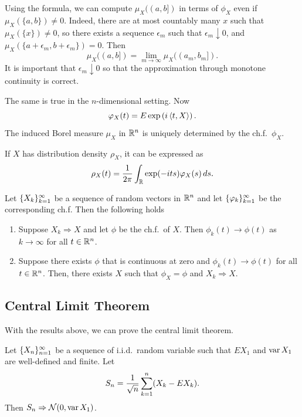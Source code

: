 \documentclass[a4paper]{article}
\newcommand{\convd}{\Rightarrow}
\begin{document}
\begin{remark}
  Using the formula, we can compute $\mu_X ((a, b])$ in terms of 
  $\phi_X$ even if $\mu_X (\{a, b\}) \neq 0$. 
  Indeed, there are at most countably many $x$ such that $\mu_X (\{x\}) 
  \neq 0$, so there exists a sequence $\epsilon_m$ such that 
  $\epsilon_m \downarrow 0$, and $\mu_X (\{a + \epsilon_m, b + \epsilon_m\}) 
  = 0$. Then 
  \[
  \mu_X ((a, b]) = \lim_{m \to \infty} \mu_X ((a_m, b_m]).
  \]
  It is important that $\epsilon_m \downarrow 0$ so that the 
  approximation through monotone continuity is correct.
\end{remark}

The same is true in the $n$-dimensional setting. Now 
\[
  \varphi_X (t) = E \exp \left( i \left\langle t, X \right\rangle \right).
\]
The induced Borel measure $\mu_X$ in $\mathbb{R}^n$ is uniquely determined by the 
ch.f.\ $\phi_X$.

\begin{thm}
  If $X$ has distribution density $\rho_X$, it can be expressed 
  as 
  \[
  \rho_X (t) = \frac{1}{2\pi} \int_{\mathbb{R}} \exp (- i t s) \varphi_X (s) \, d s.
  \]
\end{thm}

\begin{thm}[Levy]
  Let $\{ X_k \}_{k=1}^\infty$ be a sequence of random vectors in $\mathbb{R}^n$ and 
  let $\{ \varphi_k \}_{k=1}^\infty$ be the corresponding ch.f. Then the following
  holds
  \begin{enumerate}
    \item Suppose $X_k \convd X$ and let $\phi$ be the ch.f.\ of $X$.
    Then $\phi_k (t) \to \phi(t)$ as $k \to \infty$ for all $t \in \mathbb{R}^n$.

    \item Suppose there exists $\phi$ that is continuous at zero and 
    $\phi_k(t) \to \phi(t)$ for all $t \in \mathbb{R}^n$. Then, there exists $X$ 
    such that $\phi_X = \phi$ and $X_k \convd X$.
  \end{enumerate}
\end{thm}

\subsection{Central Limit Theorem}

With the results above, we can prove the central limit theorem.
\begin{thm}
  Let $\{ X_n \}_{n=1}^\infty$  be a sequence of i.i.d.\ random variable
  such that $E X_1$ and $\operatorname{var} X_1$ are well-defined and finite.
  Let
  \[
  S_n = \frac{1}{\sqrt{n}} \sum_{k=1}^n (X_k - E X_k).
  \]
  Then $S_n \convd \ncal (0, \var X_1)$.
\end{thm}
\end{document}

